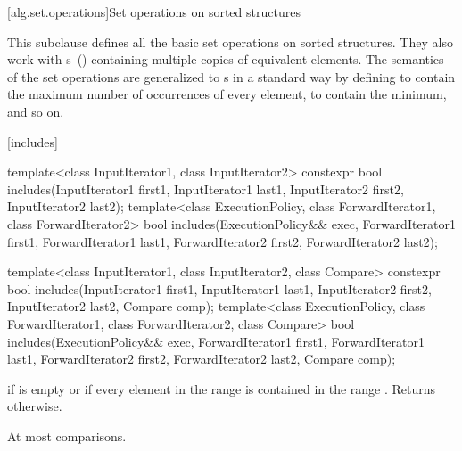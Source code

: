 [alg.set.operations]{Set operations on sorted structures}

\pnum
This subclause defines all the basic set operations on sorted structures.
They also work with
s~()
containing multiple copies of equivalent elements.
The semantics of the set operations are generalized to
s
in a standard way by defining
to contain the maximum number of occurrences of every element,
to contain the minimum, and so on.

[includes]{}

%
\begin{itemdecl}
template<class InputIterator1, class InputIterator2>
  constexpr bool includes(InputIterator1 first1, InputIterator1 last1,
                          InputIterator2 first2, InputIterator2 last2);
template<class ExecutionPolicy, class ForwardIterator1, class ForwardIterator2>
  bool includes(ExecutionPolicy&& exec,
                ForwardIterator1 first1, ForwardIterator1 last1,
                ForwardIterator2 first2, ForwardIterator2 last2);

template<class InputIterator1, class InputIterator2, class Compare>
  constexpr bool includes(InputIterator1 first1, InputIterator1 last1,
                          InputIterator2 first2, InputIterator2 last2,
                          Compare comp);
template<class ExecutionPolicy, class ForwardIterator1, class ForwardIterator2, class Compare>
  bool includes(ExecutionPolicy&& exec,
                ForwardIterator1 first1, ForwardIterator1 last1,
                ForwardIterator2 first2, ForwardIterator2 last2,
                Compare comp);
\end{itemdecl}

\begin{itemdescr}
\pnum
\returns
{}
if  is empty or
if every element in the range
is contained in the range
.
Returns
otherwise.

\pnum
\complexity
At most
comparisons.
\end{itemdescr}

